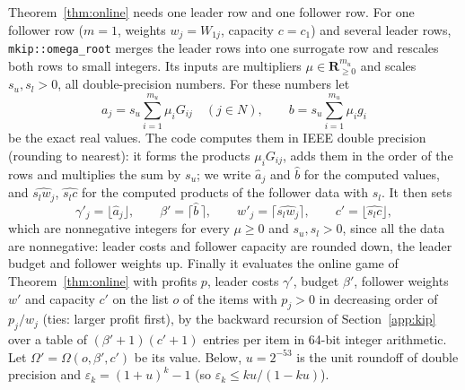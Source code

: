 Theorem~\ref{thm:online} needs one leader row and one follower row. For one
follower row ($m=1$, weights $w_j=W_{1j}$, capacity $c=c_1$) and several leader
rows, \texttt{mkip::omega\_root} merges the leader rows into one surrogate row
and rescales both rows to small integers. Its inputs are multipliers
$\mu\in\mathbf{R}^{m_u}_{\ge 0}$ and scales $s_u,s_l>0$, all double-precision
numbers. For these numbers let
\[
  a_j=s_u\sum_{i=1}^{m_u}\mu_iG_{ij}\quad(j\in N),\qquad b=s_u\sum_{i=1}^{m_u}\mu_ig_i
\]
be the exact real values. The code computes them in IEEE double precision
(rounding to nearest): it forms the products $\mu_iG_{ij}$, adds them in the
order of the rows and multiplies the sum by $s_u$; we write $\hat a_j$ and
$\hat b$ for the computed values, and $\widehat{s_lw_j}$, $\widehat{s_lc}$ for
the computed products of the follower data with $s_l$. It then sets
\[
  \gamma'_j=\lfloor\hat a_j\rfloor,\qquad
  \beta'=\lceil\hat b\,\rceil,\qquad
  w'_j=\lceil\widehat{s_lw_j}\rceil,\qquad
  c'=\lfloor\widehat{s_lc}\rfloor,
\]
which are nonnegative integers for every $\mu\ge 0$ and $s_u,s_l>0$, since
all the data are nonnegative: leader costs and follower capacity are rounded
down, the leader budget and follower weights up. Finally it evaluates the
online game of Theorem~\ref{thm:online} with profits $p$, leader costs
$\gamma'$, budget $\beta'$, follower weights $w'$ and capacity $c'$ on the
list $o$ of the items with $p_j>0$ in decreasing order of $p_j/w_j$ (ties:
larger profit first), by the backward recursion of Section~\ref{app:kip} over
a table of $(\beta'+1)(c'+1)$ entries per item in 64-bit integer arithmetic.
Let $\Omega'=\Omega(o,\beta',c')$ be its value. Below,
$u=2^{-53}$ is the unit roundoff of double precision and
$\varepsilon_k=(1+u)^k-1$ (so $\varepsilon_k\le ku/(1-ku)$).

